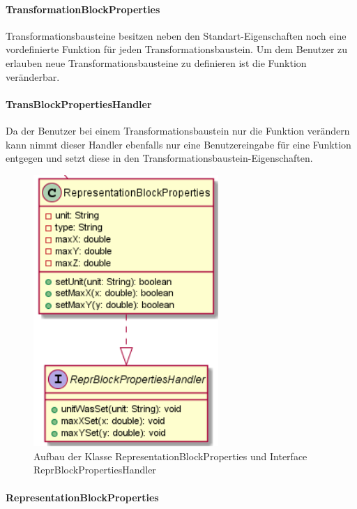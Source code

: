 \documentclass[parskip=full]{scrartcl}
\begin{document}
\paragraph{TransformationBlockProperties}

Transformationsbausteine besitzen neben den Standart-Eigenschaften noch eine vordefinierte Funktion für jeden Transformationsbaustein. Um dem Benutzer zu erlauben neue Transformationsbausteine zu definieren ist die Funktion veränderbar.

\paragraph{TransBlockPropertiesHandler}

Da der Benutzer bei einem Transformationsbaustein nur die Funktion verändern kann nimmt dieser Handler ebenfalls nur eine Benutzereingabe für eine Funktion entgegen und setzt diese in den Transformationsbaustein-Eigenschaften.

\begin{figure}[htbp]
	\begin{center}
		\includegraphics[width = 7cm]{Grafiken/View/RepresentationBlockProperties.PNG}
		\caption{Aufbau der Klasse RepresentationBlockProperties und Interface ReprBlockPropertiesHandler}
		\label{RepresentationBlockProperties}
	\end{center}
\end{figure}

\paragraph{RepresentationBlockProperties}
\end{document}
